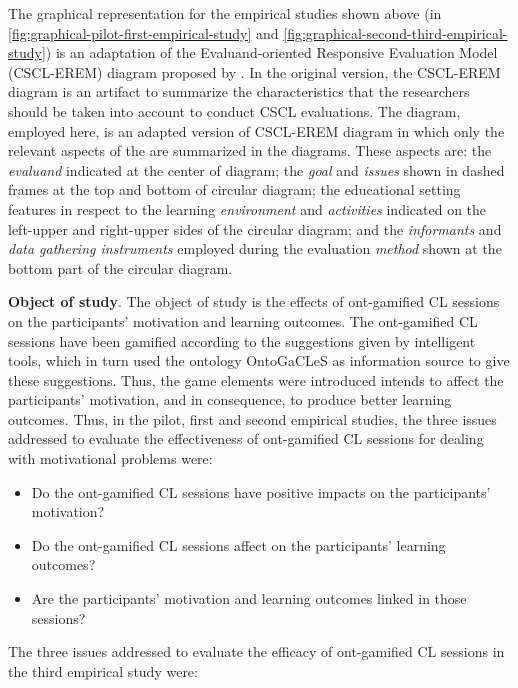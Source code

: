 \newpage
The graphical representation for the empirical studies shown above (in \autoref{fig:graphical-pilot-first-empirical-study} and \autoref{fig:graphical-second-third-empirical-study}) is an adaptation of the Evaluand-oriented Responsive Evaluation Model (CSCL-EREM) diagram proposed by .
In the original version, the CSCL-EREM diagram is an artifact to summarize the characteristics that the researchers should be taken into account to conduct CSCL evaluations.
The diagram, employed here, is an adapted version of CSCL-EREM diagram in which only the relevant aspects of the  are summarized in the diagrams. These aspects are: the \emph{evaluand} indicated at the center of diagram;
the \emph{goal} and \emph{issues} shown in dashed frames at the top and bottom of circular diagram;
the educational setting features in respect to the learning \emph{environment} and \emph{activities} indicated on the left-upper and right-upper sides of the circular diagram; and
the \emph{informants} and \emph{data gathering instruments} employed during the evaluation \emph{method} shown at the bottom part of the circular diagram.

\textbf{Object of study}.
The object of study is the effects of ont-gamified CL sessions on the participants' motivation and learning outcomes.
The ont-gamified CL sessions have been gamified according to the suggestions given by intelligent tools, which in turn used the ontology OntoGaCLeS as information source to give these suggestions. 
Thus, the game elements were introduced intends to affect the participants' motivation, and in consequence, to produce better learning outcomes.
Thus, in the pilot, first and second empirical studies, the three issues addressed to evaluate the effectiveness of ont-gamified CL sessions for dealing with motivational problems were:

\begin{itemize}
\item Do the ont-gamified CL sessions have positive impacts on the participants' motivation?
\item Do the ont-gamified CL sessions affect on the participants' learning outcomes?
\item Are the participants' motivation and learning outcomes linked in those sessions?
\end{itemize}

The three issues addressed to evaluate the efficacy of ont-gamified CL sessions in the third empirical study were:

